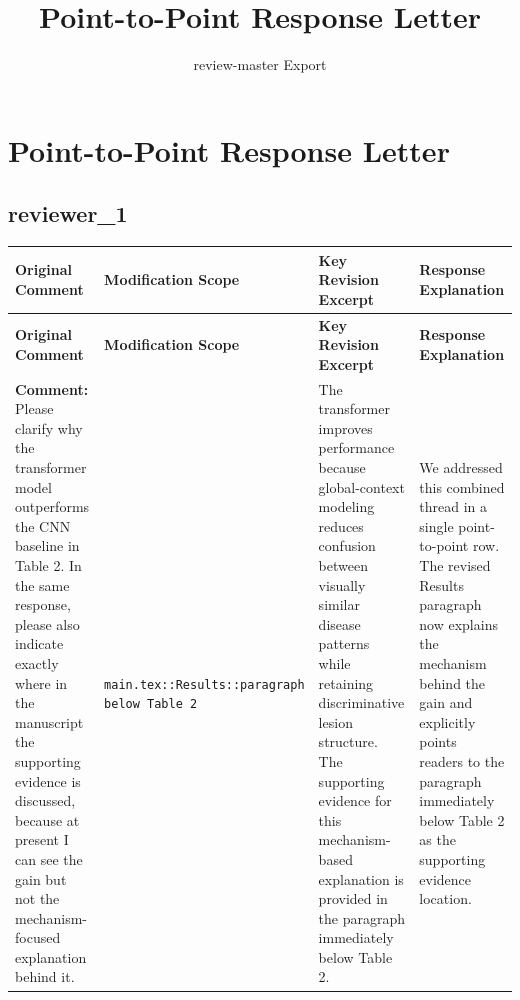 \documentclass[11pt]{article}
\title{ Point-to-Point Response Letter }
\author{ review-master Export }
\date{}
\begin{document}
\maketitle

\section*{ Point-to-Point Response Letter }

\subsection*{ reviewer\_1 }
\begin{longtable}{|p{}|p{}|p{}|p{}|}
\hline
\textbf{ Original Comment } & \textbf{ Modification Scope } & \textbf{ Key Revision Excerpt } & \textbf{ Response Explanation } \\
\hline
\endfirsthead
\hline
\textbf{ Original Comment } & \textbf{ Modification Scope } & \textbf{ Key Revision Excerpt } & \textbf{ Response Explanation } \\
\hline
\endhead
\textbf{ Comment: } Please clarify why the transformer model outperforms the CNN baseline in Table 2. In the same response, please also indicate exactly where in the manuscript the supporting evidence is discussed, because at present I can see the gain but not the mechanism-focused explanation behind it. & \texttt{ main.tex::Results::paragraph below Table 2 } & {\color{blue}\ttfamily The transformer improves performance because global-context modeling reduces confusion between visually similar disease patterns while retaining discriminative lesion structure. The supporting evidence for this mechanism-based explanation is provided in the paragraph immediately below Table 2.} & We addressed this combined thread in a single point-to-point row. The revised Results paragraph now explains the mechanism behind the gain and explicitly points readers to the paragraph immediately below Table 2 as the supporting evidence location. \\
\hline
\end{longtable}
\end{document}
